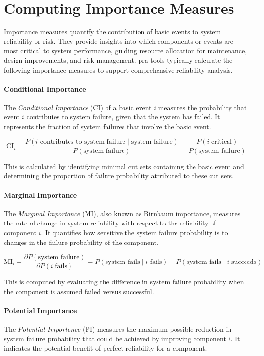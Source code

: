 \section{Computing Importance Measures}
\label{sec:foundations_importance}
Importance measures quantify the contribution of basic events to system reliability or risk. They provide insights into which components or events are most critical to system performance, guiding resource allocation for maintenance, design improvements, and risk management. \acrshort{pra} tools typically calculate the following importance measures to support comprehensive reliability analysis.

\paragraph{Conditional Importance}
The \emph{Conditional Importance} (CI) of a basic event $i$ measures the probability that event $i$ contributes to system failure, given that the system has failed. It represents the fraction of system failures that involve the basic event.

\[
\text{CI}_i = \frac{P(i \text{ contributes to system failure} \mid \text{system failure})}{P(\text{system failure})} = \frac{P(i \text{ critical})}{P(\text{system failure})}
\]

This is calculated by identifying minimal cut sets containing the basic event and determining the proportion of failure probability attributed to these cut sets.

\paragraph{Marginal Importance}
The \emph{Marginal Importance} (MI), also known as Birnbaum importance, measures the rate of change in system reliability with respect to the reliability of component $i$. It quantifies how sensitive the system failure probability is to changes in the failure probability of the component.

\[
\text{MI}_i = \frac{\partial P(\text{system failure})}{\partial P(i \text{ fails})} = P(\text{system fails} \mid i \text{ fails}) - P(\text{system fails} \mid i \text{ succeeds})
\]

This is computed by evaluating the difference in system failure probability when the component is assumed failed versus successful.

\paragraph{Potential Importance}
The \emph{Potential Importance} (PI) measures the maximum possible reduction in system failure probability that could be achieved by improving component $i$. It indicates the potential benefit of perfect reliability for a component.

